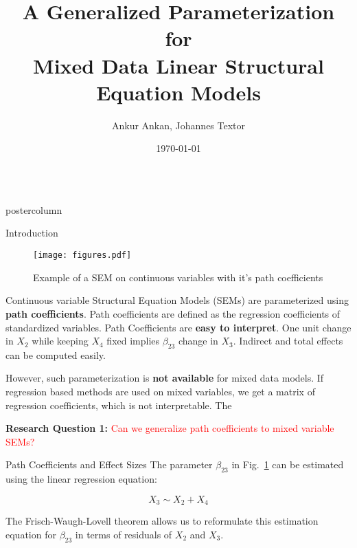 \documentclass{beamer}
\title{\huge A Generalized Parameterization for \\ Mixed Data Linear Structural Equation Models}
\author{Ankur Ankan, Johannes Textor}
\institute[RU]{Institute for Computing and Information Sciences \\ Radboud University, Netherlands}
\date{\today}
\newlength{\columnheight}
\begin{document}
\begin{frame}
\begin{columns}
	\begin{column}{.33\textwidth}
		\begin{beamercolorbox}[center]{postercolumn}
			\begin{minipage}{.98\textwidth}  %
				\parbox[t][\columnheight]{\textwidth}{ %
	\begin{myblock}{Introduction}
		\begin{figure}
			\texttt{[image: figures.pdf]}
			\label{fig:example_sem}
			\caption{Example of a SEM on continuous variables with it's path coefficients}
		\end{figure}
		
		Continuous variable Structural Equation Models (SEMs) are
		parameterized using \textbf{path coefficients}. Path coefficients
		are defined as the regression coefficients of standardized
		variables. Path Coefficients are \textbf{easy to interpret}. One unit
		change in $ X_2 $ while keeping $ X_4 $ fixed implies $
		\beta_{23} $ change in $ X_3 $. Indirect and total effects can
		be computed easily.

		\vspace{1em}

		However, such parameterization is \textbf{not available} for mixed data
		models. If regression based methods are used on mixed
		variables, we get a matrix of regression coefficients, which is
		not interpretable. The 

		\vspace{1em}

		\textbf{Research Question 1:} \textcolor{red}{Can we generalize path coefficients to mixed variable SEMs?}
	\end{myblock}\vfill
	\begin{myblock}{Path Coefficients and Effect Sizes}
		The parameter $ \beta_{23} $ in Fig.~\ref{fig:example_sem} can be estimated using the linear
		regression equation:
		
		\begin{equation*}
			X_3 \sim X_2 + X_4
		\end{equation*}
	
		The Frisch-Waugh-Lovell theorem \citep{Frisch1933} allows us to
		reformulate this estimation equation for $ \beta_{23} $ in
		terms of residuals of $ X_2 $ and $ X_3 $.


\end{myblock}}
\end{minipage}
\end{beamercolorbox}
\end{column}
\end{columns}
\end{frame}
\end{document}
